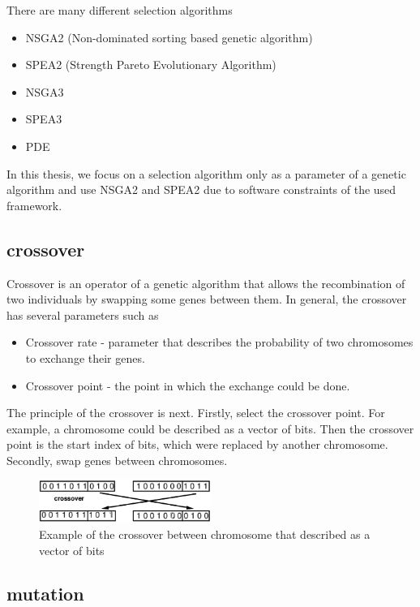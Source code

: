 There are many different selection algorithms
\begin{itemize}
	\item NSGA2 (Non-dominated sorting based genetic algorithm)
	\item SPEA2 (Strength Pareto Evolutionary Algorithm)
	\item NSGA3
	\item SPEA3
	\item PDE 
\end{itemize}
In this thesis, we focus on a selection algorithm only as a parameter of a genetic algorithm and use NSGA2 and SPEA2 due to software constraints of the used framework. 
\subsection{crossover}\label{sec:GeneticAlgorithmCrossover}
Crossover is an operator of a genetic algorithm that allows the recombination of two individuals by swapping some genes between them.
In general, the crossover has several parameters such as
\begin{itemize}
	\item Crossover rate - parameter that describes the probability of two chromosomes to exchange their genes.
	\item Crossover point - the point in which the exchange could be done.
\end{itemize}

The principle of the crossover is next.
Firstly, select the crossover point. For example, a chromosome could be described as a vector of bits. Then the crossover point is the start index of bits, which were replaced by another chromosome.
Secondly, swap genes between chromosomes.

\begin{figure}
	\centering
	\includegraphics[width=0.5\textwidth]{images/crossoverVector.png}
	\caption[Example of the crossover]{Example of the crossover between chromosome that described as a vector of bits}
	\label{fig:crossoverVector}
\end{figure}

\subsection{mutation}\label{sec:GeneticAlgorithmMutation}

